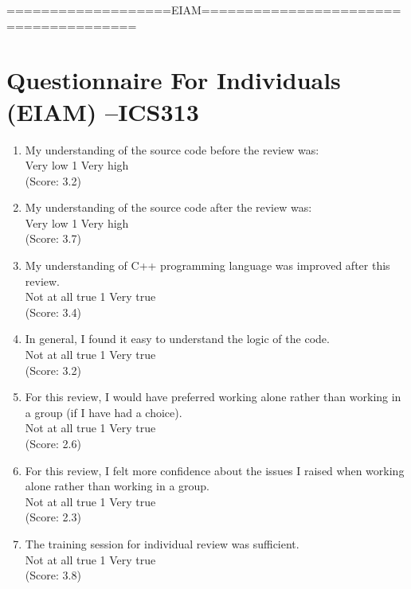 ===================EIAM======================================


\chapter {Questionnaire For Individuals (EIAM) --ICS313}

\begin{enumerate}

\item  My understanding of the source code before the review was: 
\\
Very low \hfill 1     \hfill Very high\\
(Score: 3.2)

\item  My understanding of the source code after the review was: 
\\
Very low \hfill 1     \hfill Very high\\
(Score: 3.7)

\item  My understanding of C++ programming language was improved after
this review.  
\\
Not at all true \hfill 1     \hfill Very true\\
(Score: 3.4)

\item  In general, I found it easy to understand the logic of
the code. 
\\
Not at all true \hfill 1     \hfill Very true\\
(Score: 3.2)

\item  For this review, I would have preferred working alone rather 
than working in a group (if I have had a choice).
\\
Not at all true \hfill 1     \hfill Very true\\
(Score: 2.6)

\item  For this review, I felt more confidence about the issues I raised when 
working alone rather than working in a group.
\\
Not at all true \hfill 1     \hfill Very true\\
(Score: 2.3)

\item  The training session for individual review was sufficient.
\\
Not at all true \hfill 1     \hfill Very true\\
(Score: 3.8)


\end{enumerate}
